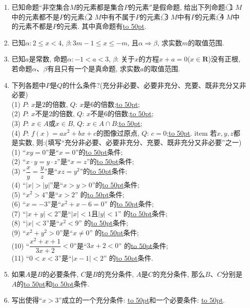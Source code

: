 \documentclass[10pt,a4paper]{article}
\newcommand{\blank}[1]{\underline{\hbox to #1pt{}}}
\begin{document}
\begin{enumerate}[1.]
(7)$\alpha: \{2\}\subset B\subseteq \{2, 3, 5\}$, $\beta:B=\{2, 5\}$; $\alpha$\blank{20}$\beta$.
\item 已知命题``非空集合$M$的元素都是集合$P$的元素$''$是假命题, 给出下列命题: \textcircled{1} $M$中的元素都不是$P$的元素; \textcircled{2} $M$中有不属于$P$的元素; \textcircled{3} $M$中有$P$的元素; \textcircled{4} $M$中的元素不都是$P$的元素. 其中真命题有\blank{50}.
\item 已知$\alpha: 2\le x<4$, $\beta: 3m-1\le x\le-m$, 且$\alpha\Rightarrow\beta$, 求实数$m$的取值范围.
\item 已知$a$是常数, 命题$\alpha :-1<a<3$, $\beta$: 关于$x$的方程$x+a=0$($x\in \mathbf{R}$)没有正根, 若命题$\alpha$、$\beta$有且只有一个是真命题, 求实数$a$的取值范围.
\item 下列各题中$P$是$Q$的什么条件?(充分非必要、必要非充分、充要、既非充分又非必要)\\
(1) $P$: $x$是$2$的倍数, $Q$: $x$是$6$的倍数;\blank{50};\\
(2) $P$: $x$不是$2$的倍数, $Q$: $x$不是$6$的倍数;\blank{50};\\
(3) $P$: $x\in A$或$x\in B$, $Q$: $x\in A\cap B$;\blank{50};\\
(4) $P$: $f(x)=ax^2+bx+c$的图像过原点, $Q$: $c=0$;\blank{50}.
item 若$x,y,z$都是实数, 则:(填写``充分非必要、必要非充分、充要、既非充分又非必要''之一)\\
(1) ``$xy=0$''是``$x=0$''的\blank{50}条件;\\
(2) ``$x\cdot y=y\cdot z$''是``$x=z$''的\blank{50}条件;\\
(3) ``$\dfrac xy=\dfrac yz$''是``$xz=y^2$''的\blank{50}条件;\\
(4) ``$|x |>| y|$''是``$x>y>0$''的\blank{50}条件;\\
(5) ``$x^2>4$''是``$x>2$'' 的\blank{50}条件;\\
(6) ``$x=-3$''是``$x^2+x-6=0$'' 的\blank{50}条件;\\
(7) ``$|x+y|<2$''是``$|x|<1$且$|y|<1$'' 的\blank{50}条件;\\
(8) ``$|x|<3$''是``$x^2<9$'' 的\blank{50}条件;\\
(9) ``$x^2+y^2>0$''是``$x\ne 0$'' 的\blank{50}条件;\\
(10) ``$\dfrac{x^2+x+1}{3x+2}<0$''是``$3x+2<0$'' 的\blank{50}条件;\\
(11) ``$0<x<3$''是``$|x-1|<2$'' 的\blank{50}条件.
\item 如果$A$是$B$的必要条件, $C$是$B$的充分条件, $A$是$C$的充分条件, 那么$B$、$C$分别是$A$的\blank{50}和\blank{50}条件.
\item 写出使得``$x>3$''成立的一个充分条件: \blank{50}和一个必要条件: \blank{50}.

\end{enumerate}
\end{document}
